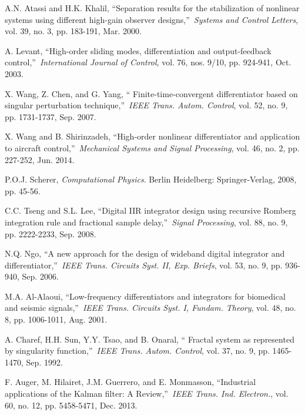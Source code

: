 \documentclass[10pt,journal]{IEEEtran}
\begin{document}
\begin{thebibliography}{99}
\bibitem{} A.N. Atassi and H.K. Khalil, \textquotedblleft Separation results
for the stabilization of nonlinear systems using different high-gain
observer designs,\textquotedblright\ \emph{Systems and Control Letters},
vol. 39, no. 3, pp. 183-191, Mar. 2000.

\bibitem{} A. Levant, \textquotedblleft High-order sliding modes,
differentiation and output-feedback control,\textquotedblright\ \emph{International Journal of Control}, vol. 76, nos. 9/10, pp. 924-941, Oct.
2003.

\bibitem{} X. Wang, Z. Chen, and G. Yang, \textquotedblleft
Finite-time-convergent differentiator based on singular perturbation
technique,\textquotedblright\ \emph{IEEE Trans. Autom. Control}, vol. 52,
no. 9, pp. 1731-1737, Sep. 2007.

\bibitem{} X. Wang and B. Shirinzadeh, \textquotedblleft High-order
nonlinear differentiator and application to aircraft
control,\textquotedblright\ \emph{Mechanical Systems and Signal Processing},
vol. 46, no. 2, pp. 227-252, Jun. 2014.

\bibitem{} P.O.J. Scherer, \emph{Computational Physics}. Berlin Heidelberg:
Springer-Verlag, 2008, pp. 45-56.

\bibitem{} C.C. Tseng and S.L. Lee, \textquotedblleft Digital IIR integrator
design using recursive Romberg integration rule and fractional sample
delay,\textquotedblright\ \emph{Signal Processing}, vol. 88, no. 9, pp.
2222-2233, Sep. 2008.

\bibitem{} N.Q. Ngo, \textquotedblleft A new approach for the design of
wideband digital integrator and differentiator,\textquotedblright\ \emph{IEEE Trans. Circuits Syst. II, Exp. Briefs}, vol. 53, no. 9, pp. 936-940,
Sep. 2006.

\bibitem{} M.A. Al-Alaoui, \textquotedblleft Low-frequency differentiators
and integrators for biomedical and seismic signals,\textquotedblright\ \emph{IEEE Trans. Circuits Syst. I, Fundam. Theory}, vol. 48, no. 8, pp.
1006-1011, Aug. 2001.

\bibitem{} A. Charef, H.H. Sun, Y.Y. Tsao, and B. Onaral, \textquotedblleft
Fractal system as represented by singularity function,\textquotedblright\
\emph{IEEE Trans. Autom. Control}, vol. 37, no. 9, pp. 1465-1470, Sep. 1992.

\bibitem{} F. Auger, M. Hilairet, J.M. Guerrero, and E. Monmasson,
\textquotedblleft Industrial applications of the Kalman filter: A
Review,\textquotedblright\ \emph{IEEE Trans. Ind. Electron.}, vol. 60, no.
12, pp. 5458-5471, Dec. 2013.


\end{thebibliography}
\end{document}
